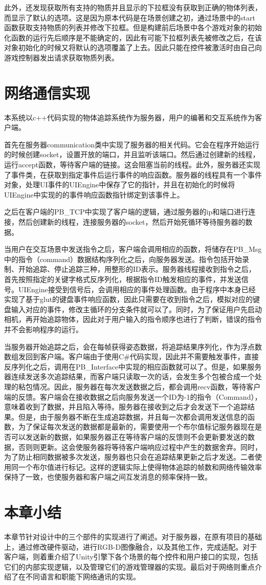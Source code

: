     此外，还发现获取所有支持的物质并且显示的下拉框没有获取到正确的物体列表，而显示了默认的选项。这是因为原本代码是在场景创建之初，通过场景中的start函数获取支持物质的列表并修改下拉框。但是构建前后场景中各个游戏对象的初始化函数的运行先后顺序是不能确定的，因此有可能下拉框列表先被修改之后，在该对象初始化的时候又将默认的选项覆盖了上去。因此只能在控件被激活时由自己向游戏控制器发出请求获取物质列表。
    
\section{网络通信实现}

本系统以c++代码实现的物体追踪系统作为服务器，用户的编著和交互系统作为客户端。

首先在服务器communication类中实现了服务器的相关代码。它会在程序开始运行的时候创建socket，设置开放的端口，并且监听该端口。然后通过创建新的线程，运行accept函数，等待客户端的链接。这会阻塞当前的线程。此外，服务器还实现了事件类，在获取到指定事件后运行事件的响应函数。服务器的线程具有一个事件对象，处理UI事件的UIEngine中保存了它的指针，并且在初始化的时候将UIEngine中实现的的事件响应函数指针绑定到该事件上。

之后在客户端的PB\_TCP中实现了客户端的逻辑，通过服务器的ip和端口进行连接，然后创建新的线程，连接服务器的socket，然后开始死循环等待服务器的数据。

当用户在交互场景中发送指令之后，客户端会调用相应的函数，将储存在PB\_Msg中的指令（command）数据结构序列化之后，向服务器发送。指令包括开始录制、开始追踪、停止追踪三种，用整形的ID表示。服务器线程接收到指令之后，首先按照指定的关键字格式反序列化，根据指令ID触发相应的事件，并发送信号。UIEngine接受到信号后，会调用相应的事件处理函数。由于程序中本身已经实现了基于glut的键盘事件响应函数，因此只需要在收到指令之后，模拟对应的键盘输入对应的事件，修改主循环的分支条件就可以了。同时，为了保证用户先启动相机，再开始追踪物体，因此对于用户输入的指令顺序也进行了判断，错误的指令并不会影响程序的运行。

当服务器开始追踪之后，会在每帧获得姿态数据，将追踪结果序列化，作为浮点数数组发回到客户端。客户端由于使用C\#代码实现，因此并不需要触发事件，直接反序列化之后，调用在PB\_Interface中实现的相应函数就可以了。但是，如果服务器连续发送多次追踪结果，而客户端只读取一次的话，会发生多个包被合成一个处理的粘包情况。因此，服务器在每次发送数据之后，都会调用recv函数，等待客户端的反馈。客户端会在接收数据之后向服务发送一个ID为-1的指令（Command），意味着收到了数据，并且陷入等待。服务器在接收到之后才会发送下一个追踪结果。但是，由于服务器不断在生成追踪数据，并且每一次都会调用发送信息的函数，为了保证每次发送的数据都是最新的，需要使用一个布尔值标记服务器现在是否可以发送新的数据，如果服务器正在等待客户端的反馈则不会更新要发送的数据，否则则更新。这会使服务器将等待客户端响应过程中产生的数据舍弃。同时，为了防止相同数据被多次发送，服务器也只会在追踪结果更新之后才发送。二者使用同一个布尔值进行标记。这样的逻辑实际上使得物体追踪的帧数和网络传输效率保持了一致，也使服务器和客户端之间互发消息的频率保持一致。

\section{本章小结}
本章节针对设计中的三个部件的实现进行了阐述。对于服务器，在原有项目的基础上，通过修改硬件驱动，进行RGB-D图像融合，以及其他工作，完成适配。对于客户端，则着重介绍了Unity引擎下各个场景的每个控件和用户接口的实现，包括它们的内部实现逻辑，以及管理它们的游戏管理器的实现。最后对于网络则重点介绍了在不同语言和职能下网络通讯的实现。
